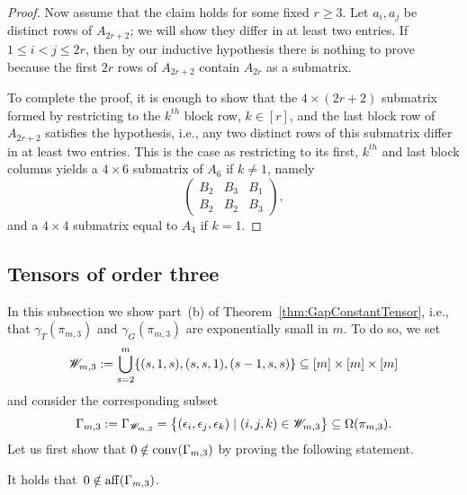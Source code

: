 \begin{proof}
	Now assume that the claim holds for some fixed $r \geq 3$. Let $a_i, a_j$ be distinct rows of $A_{2r + 2}$; we will show they differ in at least two entries. If $1 \leq i<j \leq 2r$, then by our inductive hypothesis there is nothing to prove because the first $2r$ rows of $A_{2r+2}$ contain $A_{2r}$ as a submatrix. 
	
	To complete the proof, it is enough to show that the $4\times (2r + 2)$ submatrix formed by restricting to the $k^{th}$ block row, $k \in [r]$, and the last block row of $A_{2r + 2}$ satisfies the hypothesis, i.e., any two distinct rows of this submatrix differ in at least two entries. This is the case as restricting to its first, $k^{th}$ and last block columns yields a $4 \times 6$ submatrix of $A_6$ if $k \neq 1$, namely 
	$$\begin{pmatrix}
		B_2 & B_3 & B_1\\
		B_2 & B_2 & B_3
	\end{pmatrix},$$
	and a $4 \times 4$ submatrix equal to $A_4$ if $k = 1$. 
\end{proof}




\subsection{Tensors of order three} \label{subsec:3Tensors}

In this subsection we show part~(b) of Theorem~\ref{thm:GapConstantTensor}, i.e., that $\gamma_T(\pi_{m,3})$ and $\gamma_G(\pi_{m,3})$ are exponentially small in $m$. To do so, we set
\begin{equation}
	\mathscr{W}_{m,3} := \bigcup_{s=2}^m \lbrace (s,1,s), (s,s,1), (s-1,s,s) \rbrace \subseteq [m] \times [m] \times [m]
\end{equation}
and consider the corresponding subset
\begin{equation}
	\Gamma_{m,3} := \Gamma_{\mathscr{W}_{m,3}} = \big\lbrace (\epsilon_i,\epsilon_j,\epsilon_k) \mid (i,j,k) \in \mathscr{W}_{m,3} \big \rbrace \subseteq \Omega(\pi_{m,3}).
\end{equation}
Let us first show that $0 \notin \operatorname{conv}(\Gamma_{m,3})$ by proving the following statement.

\begin{lemma} \label{lem:affineHullKravtsov}
	It holds that $\, 0 \notin \operatorname{aff}(\Gamma_{m,3})$.
\end{lemma}

